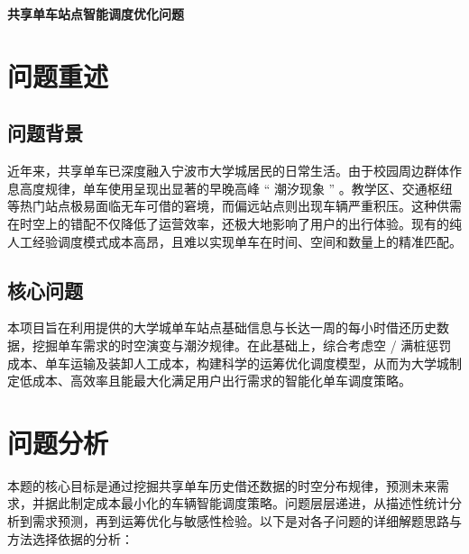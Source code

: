 \documentclass[a4paper, 12pt]{ctexart}
\begin{document}
\begin{center}
    { \textbf{共享单车站点智能调度优化问题}} \\[1ex]
\end{center}

\begin{abstract}
（摘要为论文精华，约 300–500 字。须独立成篇，简明扼要地概括：研究问题、所用方法/模型、主要结论和数字结果。评委首先阅读摘要，请务必认真撰写。摘要中不应出现公式，不引用参考文献。）

\vspace{1ex}
\noindent \textbf{关键词：} 关键词1；关键词2；关键词3；关键词4（3–5 个，以分号分隔）
\end{abstract}

\newpage
\tableofcontents
\newpage



\section{问题重述}

\subsection{问题背景}
近年来，共享单车已深度融入宁波市大学城居民的日常生活。由于校园周边群体作息高度规律，单车使用呈现出显著的早晚高峰 “ 潮汐现象 ” 。教学区、交通枢纽等热门站点极易面临无车可借的窘境，而偏远站点则出现车辆严重积压。这种供需在时空上的错配不仅降低了运营效率，还极大地影响了用户的出行体验。现有的纯人工经验调度模式成本高昂，且难以实现单车在时间、空间和数量上的精准匹配。

\subsection{核心问题}
本项目旨在利用提供的大学城单车站点基础信息与长达一周的每小时借还历史数据，挖掘单车需求的时空演变与潮汐规律。在此基础上，综合考虑空 / 满桩惩罚成本、单车运输及装卸人工成本，构建科学的运筹优化调度模型，从而为大学城制定低成本、高效率且能最大化满足用户出行需求的智能化单车调度策略。

\section{问题分析}

本题的核心目标是通过挖掘共享单车历史借还数据的时空分布规律，预测未来需求，并据此制定成本最小化的车辆智能调度策略。问题层层递进，从描述性统计分析到需求预测，再到运筹优化与敏感性检验。以下是对各子问题的详细解题思路与方法选择依据的分析：
\end{document}
